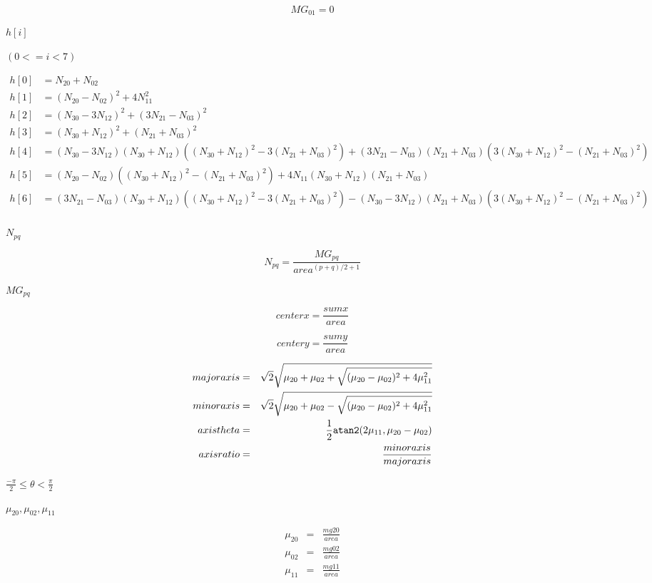 \documentclass{article}
\begin{document}
\[ MG_{01} = 0 \]
\pagebreak

$h[i]$
\pagebreak

$(0 <= i < 7)$
\pagebreak

\[ \begin{aligned} h[0] &= N_{20} + N_{02} \\ h[1] &= (N_{20} - N_{02})^2 + 4 N_{11}^2 \\ h[2] &= (N_{30} - 3 N_{12})^2 + (3 N_{21} - N_{03})^2 \\ h[3] &= (N_{30} + N_{12})^2 + (N_{21} + N_{03})^2 \\ h[4] &= (N_{30} - 3 N_{12})(N_{30} + N_{12}) ((N_{30} + N_{12})^2 - 3(N_{21} + N_{03})^2) + (3 N_{21} - N_{03})(N_{21} + N_{03}) (3(N_{30} + N_{12})^2 - (N_{21} + N_{03})^2) \\ h[5] &= (N_{20} - N_{02}) ((N_{30} + N_{12})^2 - (N_{21} + N_{03})^2) + 4 N_{11}(N_{30} + N_{12})(N_{21} + N_{03}) \\ h[6] &= (3 N_{21} - N_{03})(N_{30} + N_{12}) ((N_{30} + N_{12})^2 - 3(N_{21} + N_{03})^2) - (N_{30} - 3 N_{12})(N_{21} + N_{03}) (3(N_{30} + N_{12})^2 - (N_{21} + N_{03})^2) \\ \end{aligned} \]
\pagebreak

$N_{pq}$
\pagebreak

\[N_{pq} = \frac{MG_{pq}}{area^{(p+q)/2+1}}\]
\pagebreak

$MG_{pq}$
\pagebreak

\[centerx = \frac{sumx}{area}\]
\pagebreak

\[centery = \frac{sumy}{area}\]
\pagebreak

\begin{eqnarray*} majoraxis &=& \sqrt{2}\sqrt{\mu_{20}+\mu_{02}+\sqrt{(\mu_{20}-\mu_{02})^2+4\mu_{11}^2}}\\ minoraxis &=& \sqrt{2}\sqrt{\mu_{20}+\mu_{02}-\sqrt{(\mu_{20}-\mu_{02})^2+4\mu_{11}^2}}\\ axistheta &=& \frac{1}{2}{\tt atan2}(2 \mu_{11},\mu_{20}-\mu_{02})\\ axisratio &=& \frac{minoraxis}{majoraxis} \end{eqnarray*}
\pagebreak

$ \frac{-\pi}{2} \le \theta < \frac{\pi}{2} $
\pagebreak

$\mu_{20}, \mu_{02}, \mu_{11}$
\pagebreak

\begin{eqnarray*} \mu_{20} &=& \frac{mg20}{area} \\ \mu_{02} &=& \frac{mg02}{area} \\ \mu_{11} &=& \frac{mg11}{area} \end{eqnarray*}
\pagebreak
\end{document}
